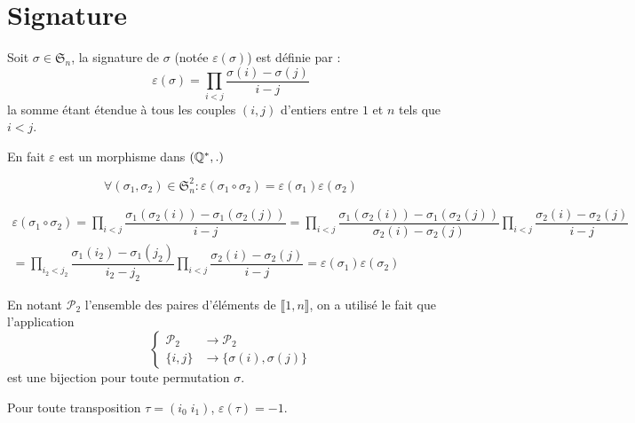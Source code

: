\section{Signature}
\begin{defi}
 Soit $\sigma\in \mathfrak S_n$, la signature de $\sigma$ (notée $\varepsilon(\sigma)$) est définie par :
\begin{displaymath}
 \varepsilon(\sigma) = \prod_{i<j}\dfrac{\sigma(i)-\sigma(j)}{i-j}
\end{displaymath}
la somme étant étendue à tous les couples $(i,j)$ d'entiers entre $1$ et $n$ tels que $i<j$.
\end{defi}
En fait $\varepsilon$ est un morphisme dans $(\mathbb{Q}^*, .)$
\begin{propn}
 \begin{displaymath}
  \forall (\sigma_1,\sigma_2)\in \mathfrak S_n ^2 : \varepsilon(\sigma_1 \circ \sigma_2)
= \varepsilon(\sigma_1) \varepsilon(\sigma_2)
 \end{displaymath}
\end{propn}
\begin{demo}
 \begin{multline*}
  \varepsilon(\sigma_1 \circ \sigma_2)
= \prod_{i<j}\dfrac{\sigma_1(\sigma_2(i))-\sigma_1(\sigma_2(j))}{i-j}
= \prod_{i<j}\dfrac{\sigma_1(\sigma_2(i))-\sigma_1(\sigma_2(j))}{\sigma_2(i)-\sigma_2(j)}
  \prod_{i<j}\dfrac{\sigma_2(i)-\sigma_2(j)}{i-j}\\
=  \prod_{i_2<j_2}\dfrac{\sigma_1(i_2)-\sigma_1(j_2)}{i_2-j_2}
  \prod_{i<j}\dfrac{\sigma_2(i)-\sigma_2(j)}{i-j} 
= \varepsilon(\sigma_1)\varepsilon(\sigma_2)
 \end{multline*}
\end{demo}
En notant $\mathcal P_2$ l'ensemble des paires d'éléments de $\llbracket 1,n \rrbracket$, on a utilisé le fait que l'application
\begin{displaymath}
 \left\lbrace 
\begin{aligned}
 \mathcal P_2 &\rightarrow \mathcal P_2 \\
 \{i,j\} &\rightarrow \{\sigma(i),\sigma(j)\}
\end{aligned}
\right. 
\end{displaymath}
est une bijection pour toute permutation $\sigma$.
\begin{propn}
 Pour toute transposition $\tau = (i_0\;i_1)$, $\varepsilon(\tau)=-1$.
\end{propn}
